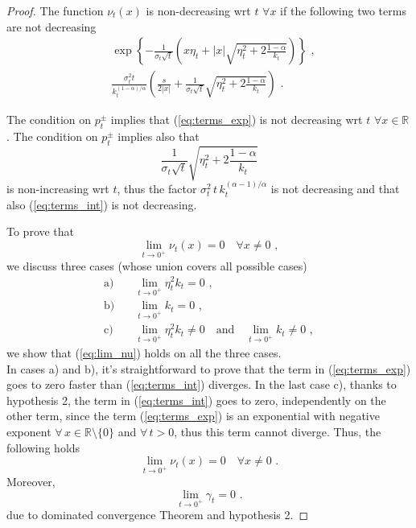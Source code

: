 \documentclass[12pt]{article}
\theoremstyle{definition}
\theoremstyle{remark}
\numberwithin{theorem}{section}
\numberwithin{proposition}{section}
\numberwithin{lemma}{section}
\numberwithin{corollary}{section}
\numberwithin{definition}{section}
\numberwithin{remark}{section}
\numberwithin{example}{section}
\newcommand{\R}{\mathbb{R}}
\begin{document}
\begin{proof}
\smallskip

The function $\nu_t(x)$ is non-decreasing wrt $t$ $\forall x$ if the following two terms are not decreasing
\begin{align}
&\label{eq:terms_exp}\exp\left\{-\frac{1}{\sigma_t\sqrt{t}}\left(x\eta_t+|x|\sqrt{\eta_t^2+2\frac{1-\alpha}{k_t}}\right)\right\}\,\,,\\
&\label{eq:terms_int}\frac{\sigma_t^2t}{k_t^{(1-\alpha)/\alpha}}\left(\frac{s}{2|x|}+\frac{1}{\sigma_t\sqrt{t}}\sqrt{\eta_t^2+2\frac{1-\alpha}{k_t}}\right)\,\, .
\end{align}

The condition on $p_t^\pm$ implies that (\ref{eq:terms_exp}) is not decreasing wrt $t$ $\forall x\in\R$. The condition on $p_t^\pm$ implies also that
\begin{equation*}
\frac{1}{\sigma_t\sqrt{t}}\sqrt{\eta_t^2+2\frac{1-\alpha}{k_t}}
\end{equation*}
is non-increasing wrt $t$, thus the factor $\sigma_t^2\,t\,k_t^{(\alpha-1)/\alpha}$ is not decreasing and that also (\ref{eq:terms_int}) is not decreasing.

\bigskip

To prove that
\begin{equation}
\label{eq:lim_nu}
\lim_{t\rightarrow0^+}\nu_t(x)=0\quad\forall x\neq0\,\,,
\end{equation}
we discuss three cases (whose union covers all possible cases)
\begin{align*}
\mathrm{a)}\quad&\lim_{t\rightarrow0^+}\eta_t^2k_t=0\,\, ,\\
\mathrm{b)}\quad&\lim_{t\rightarrow0^+}k_t=0\,\, ,\\
\mathrm{c)}\quad&\lim_{t\rightarrow0^+}\eta_t^2k_t\neq0\quad\mathrm{and}\quad\lim_{t\rightarrow0^+}k_t\neq0\,\, ,
\end{align*}
we show that (\ref{eq:lim_nu}) holds on all the three cases. \\
In cases a) and b), it's straightforward to prove that the term in (\ref{eq:terms_exp}) goes to zero faster than (\ref{eq:terms_int}) diverges. In the last case c), thanks to hypothesis 2, the term in (\ref{eq:terms_int}) goes to zero, independently on the other term, since the term (\ref{eq:terms_exp}) is an exponential with negative exponent $\forall\,x\in\R\setminus\{0\}$ and $\forall\,t>0$, thus this term cannot diverge.
\smallskip
Thus, the following holds
\begin{equation*}
\lim_{t\rightarrow0^+}\nu_t(x)=0\quad\forall x\neq0\,\,.
\end{equation*}
Moreover,
\begin{equation*}
\lim_{t\rightarrow0^+}\gamma_t=0\,\, .
\end{equation*}
due to dominated convergence Theorem and hypothesis 2.


\end{proof}
\end{document}
